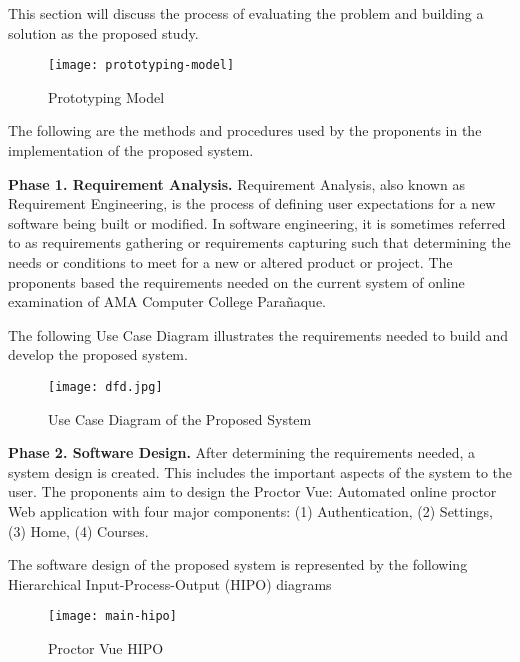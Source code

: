 This section will discuss the process of evaluating the problem and building a solution as the proposed study.

\begin{figure}[h!]
   \begin{center}
      \texttt{[image: prototyping-model]}
      \caption{Prototyping Model}
   \end{center}
\end{figure}

The following are the methods and procedures used by the proponents in the implementation of the proposed system.

\textbf{Phase 1. Requirement Analysis.}
Requirement Analysis, also known as Requirement Engineering, is the process of defining user expectations for a new software being built or modified.
In software engineering, it is sometimes referred to as requirements gathering or requirements capturing such that determining the needs or conditions to meet for a new or altered product or project.
The proponents based the requirements needed on the current system of online examination of AMA Computer College Parañaque.

The following Use Case Diagram illustrates the requirements needed to build and develop the proposed system.

\begin{figure}[h!]
   \begin{center}
      \texttt{[image: dfd.jpg]}
      \caption{Use Case Diagram of the Proposed System}
   \end{center}
\end{figure}

\textbf{Phase 2. Software Design.}
After determining the requirements needed, a system design is created.
This includes the important aspects of the system to the user.
The proponents aim to design the Proctor Vue: Automated online proctor Web application with four major components: (1) Authentication, (2) Settings, (3) Home, (4) Courses.

The software design of the proposed system is represented by the following Hierarchical Input-Process-Output (HIPO) diagrams

\begin{figure}[h!]
   \begin{center}
      \texttt{[image: main-hipo]}
      \caption{Proctor Vue HIPO}
   \end{center}
\end{figure}

